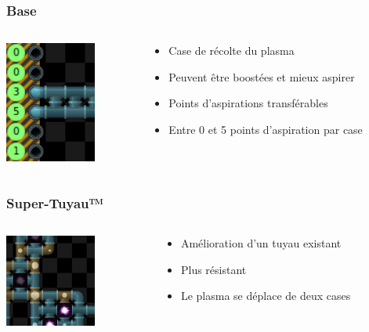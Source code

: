 \documentclass{beamer}
\begin{document}
\begin{frame}
	\frametitle{Base}
    \begin{columns}[T]
        \begin{column}{.3\textwidth}
            \includegraphics[width=3cm]{pictures/aspiration}
        \end{column}
        \begin{column}{.7\textwidth}
            \begin{itemize}
                \item Case de récolte du plasma
                \item Peuvent être boostées et mieux aspirer
                \item Points d'aspirations transférables
                \item Entre 0 et 5 points d'aspiration par case
            \end{itemize}
        \end{column}
    \end{columns}
\end{frame}

\begin{frame}
    \frametitle{Super-Tuyau™}
    \begin{columns}[T]
        \begin{column}{.3\textwidth}
            \includegraphics[width=3cm]{pictures/super-tuyau}
        \end{column}
        \begin{column}{.7\textwidth}
            \begin{itemize}
                \item Amélioration d'un tuyau existant
                \item Plus résistant
                \item Le plasma se déplace de deux cases
            \end{itemize}
        \end{column}
    \end{columns}
\end{frame}
\end{document}
